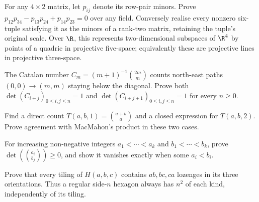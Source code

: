 \begin{exercise}[$\star\star$]\label{linear:ex:plucker}
For any $4\times2$ matrix, let $p_{ij}$ denote its row-pair minors. Prove $p_{12}p_{34}-p_{13}p_{24}+p_{14}p_{23}=0$ over any field. Conversely realise every nonzero six-tuple satisfying it as the minors of a rank-two matrix, retaining the tuple's original scale. Over $\R$, this represents two-dimensional subspaces of $\R^4$ by points of a quadric in projective five-space; equivalently these are projective lines in projective three-space.
\end{exercise}
\begin{exercise}[$\star\star$]\label{linear:ex:catalan}
The Catalan number $C_m=(m+1)^{-1}\binom{2m}m$ counts north-east paths $(0,0)\to(m,m)$ staying below the diagonal. Prove both $\det(C_{i+j})_{0\le i,j\le n}=1$ and $\det(C_{i+j+1})_{0\le i,j\le n}=1$ for every $n\ge0$.
\end{exercise}
\begin{exercise}[$\star\star$]\label{linear:ex:hex2}
Find a direct count $T(a,b,1)=\binom{a+b}a$ and a closed expression for $T(a,b,2)$. Prove agreement with MacMahon's product in these two cases.
\end{exercise}
\begin{exercise}[$\star\star$]\label{linear:ex:vandermondelgv}
For increasing non-negative integers $a_1<\cdots<a_k$ and $b_1<\cdots<b_k$, prove $\det(\binom{a_i}{b_j})\ge0$, and show it vanishes exactly when some $a_i<b_i$.
\end{exercise}
\begin{exercise}[$\star\star$]\label{linear:ex:calisson}
Prove that every tiling of $H(a,b,c)$ contains $ab,bc,ca$ lozenges in its three orientations. Thus a regular side-$n$ hexagon always has $n^2$ of each kind, independently of its tiling.
\end{exercise}

